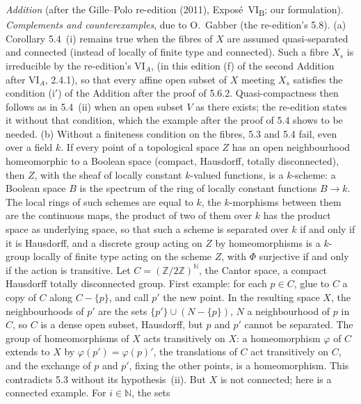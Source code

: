 
\par\medskip\noindent
\emph{Addition} (after the Gille--Polo re-edition (2011), Expos\'e~VI\textsubscript{B}; our formulation).
\emph{Complements and counterexamples}, due to O.~Gabber (the re-edition's 5.8).
(a) Corollary 5.4~(i) remains true when the fibres of \(X\) are assumed quasi-separated and connected (instead of
locally of finite type and connected). Such a fibre \(X_s\) is irreducible by the re-edition's VI\(_A\),
 (in this edition (f) of the second Addition after VI\(_A\), 2.4.1), so
that every affine open subset of \(X\) meeting \(X_s\) satisfies the condition (i\('\)) of the Addition after the
proof of 5.6.2. Quasi-compactness then follows as in 5.4~(ii) when an open subset \(V\) as there exists; the
re-edition states it without that condition, which the example after the proof of 5.4 shows to be needed.
(b) Without a finiteness condition on the fibres, 5.3 and 5.4 fail, even over a field \(k\). If every point of a
topological space \(Z\) has an open neighbourhood homeomorphic to a Boolean space (compact, Hausdorff, totally
disconnected), then \(Z\), with the sheaf of locally constant \(k\)-valued functions, is a \(k\)-scheme: a Boolean
space \(B\) is the spectrum of the ring of locally constant functions \(B\to k\). The local rings of such schemes
are equal to \(k\), the \(k\)-morphisms between them are the continuous maps, the product of two of them over
\(k\) has the product space as underlying space, so that such a scheme is separated over \(k\) if and only if it is
Hausdorff, and a discrete group acting on \(Z\) by homeomorphisms is a \(k\)-group locally of finite type acting on
the scheme \(Z\), with \(\Phi\) surjective if and only if the action is transitive. Let \(C=(\mathbb Z/2\mathbb
Z)^{\mathbb N}\), the Cantor space, a compact Hausdorff totally disconnected group. First example: for each
\(p\in C\), glue to \(C\) a copy of \(C\) along \(C-\{p\}\), and call \(p'\) the new point. In the resulting space
\(X\), the neighbourhoods of \(p'\) are the sets \(\{p'\}\cup(N-\{p\})\), \(N\) a neighbourhood of \(p\) in
\(C\), so \(C\) is a dense open subset, Hausdorff, but \(p\) and \(p'\) cannot be separated. The group of
homeomorphisms of \(X\) acts transitively on \(X\): a homeomorphism \(\varphi\) of \(C\) extends to \(X\) by
\(\varphi(p')=\varphi(p)'\), the translations of \(C\) act transitively on \(C\), and the exchange of \(p\) and
\(p'\), fixing the other points, is a homeomorphism. This contradicts 5.3 without its hypothesis~(ii). But \(X\)
is not connected; here is a connected example. For \(i\in\mathbb N\), the sets
